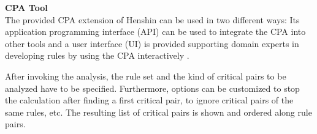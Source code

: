 \textbf{CPA Tool}\\
The provided CPA extension of Henshin can be used in two diﬀerent ways: Its application programming interface (API) can be used to integrate the CPA into other tools and a user interface (UI) is provided supporting domain experts in developing rules by using the CPA interactively \cite{mens2007analysing}.

After invoking the analysis, the rule set and the kind of critical pairs to be analyzed have to be speciﬁed. Furthermore, options can be customized to stop the calculation after ﬁnding a ﬁrst critical pair, to ignore critical pairs of the same rules, etc. The resulting list of critical pairs is shown and ordered along rule pairs. 

